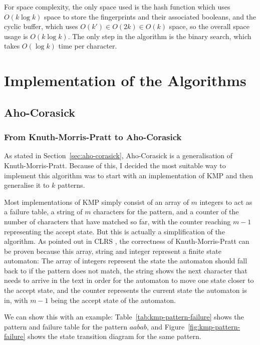 \documentclass[ %
                    author={Dominic Joseph Moylett},
                    degree={MEng},
                     title={Dictionary Matching with Fingerprints},
                  subtitle={An Empirical Analysis},
                      type={research},
                      year={2015} ]{dissertation}
\begin{document}
For space complexity, the only space used is the hash function which uses $O(k\log k)$ space to store the fingerprints and their associated booleans, and the cyclic buffer, which uses $O(k') \in O(2k) \in O(k)$ space, so the overall space usage is $O(k\log k)$. The only step in the algorithm is the binary search, which takes $O(\log k)$ time per character.


\chapter{Implementation of the Algorithms}
\label{chap:execution}

\section{Aho-Corasick}

\subsection{From Knuth-Morris-Pratt to Aho-Corasick}

As stated in Section~\ref{sec:aho-corasick}, Aho-Corasick \cite{Aho:1975:ESM:360825.360855} is a generalisation of Knuth-Morris-Pratt. Because of this, I decided the most suitable way to implement this algorithm was to start with an implementation of KMP and then generalise it to $k$ patterns.

Most implementations of KMP simply consist of an array of $m$ integers to act as a failure table, a string of $m$ characters for the pattern, and a counter of the number of characters that have matched so far, with the counter reaching $m - 1$ representing the accept state. But this is actually a simplification of the algorithm. As pointed out in CLRS \cite{clrs:kmp}, the correctness of Knuth-Morris-Pratt can be proven because this array, string and integer represent a finite state automaton: The array of integers represent the state the automaton should fall back to if the pattern does not match, the string shows the next character that needs to arrive in the text in order for the automaton to move one state closer to the accept state, and the counter represents the current state the automaton is in, with $m - 1$ being the accept state of the automaton.

We can show this with an example: Table~\ref{tab:kmp-pattern-failure} shows the pattern and failure table for the pattern $aabab$, and Figure~\ref{fig:kmp-pattern-failure} shows the state transition diagram for the same pattern.
\end{document}
